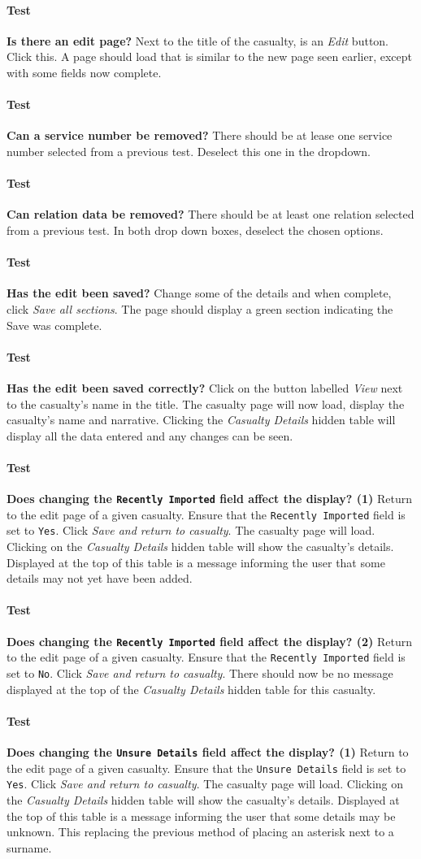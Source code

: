 \documentclass[12pt]{article}
\newcounter{Test}
\newcommand{\test}[1]{%
\stepcounter{Test}%
\paragraph{Test \theTest} \textbf{#1} }
\begin{document}
\test{Is there an edit page?}
Next to the title of the casualty, is an \textit{Edit} button. Click this. A page should load that is similar to the new page seen earlier, except with some fields now complete.

\test{Can a service number be removed?}
There should be at lease one service number selected from a previous test. Deselect this one in the dropdown.

\test{Can relation data be removed?}
There should be at least one relation selected from a previous test. In both drop down boxes, deselect the chosen options.

\test{Has the edit been saved?}
Change some of the details and when complete, click \textit{Save all sections}. The page should display a green section indicating the Save was complete.

\test{Has the edit been saved correctly?}
Click on the button labelled \textit{View} next to the casualty's name in the title. The casualty page will now load, display the casualty's name and narrative. Clicking the \textit{Casualty Details} hidden table will display all the data entered and any changes can be seen.

\test{Does changing the \texttt{Recently Imported} field affect the display? (1)}
Return to the edit page of a given casualty. Ensure that the \texttt{Recently Imported} field is set to \texttt{Yes}. Click \textit{Save and return to casualty}. The casualty page will load. Clicking on the \textit{Casualty Details} hidden table will show the casualty's details. Displayed at the top of this table is a message informing the user that some details may not yet have been added.

\test{Does changing the \texttt{Recently Imported} field affect the display? (2)}
Return to the edit page of a given casualty. Ensure that the \texttt{Recently Imported} field is set to \texttt{No}. Click \textit{Save and return to casualty}. There should now be no message displayed at the top of the  \textit{Casualty Details} hidden table for this casualty.

\test{Does changing the \texttt{Unsure Details} field affect the display? (1)}
Return to the edit page of a given casualty. Ensure that the \texttt{Unsure Details} field is set to \texttt{Yes}. Click \textit{Save and return to casualty}. The casualty page will load. Clicking on the \textit{Casualty Details} hidden table will show the casualty's details. Displayed at the top of this table is a message informing the user that some details may be unknown. This replacing the previous method of placing an asterisk next to a surname.
\end{document}
